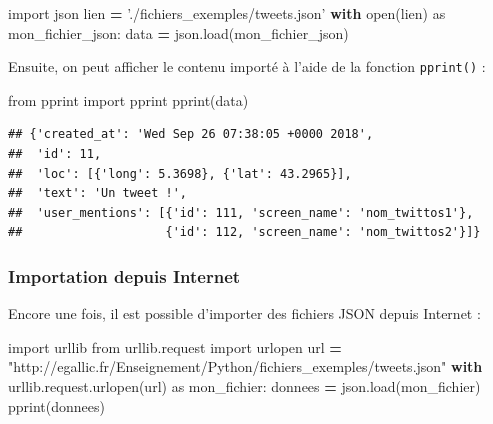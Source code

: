 \documentclass[12pt,]{book}
\newenvironment{Shaded}{\begin{snugshade}}{\end{snugshade}}
\newcommand{\StringTok}[1]{\textcolor[rgb]{0.31,0.60,0.02}{#1}}
\newcommand{\ImportTok}[1]{#1}
\newcommand{\ControlFlowTok}[1]{\textcolor[rgb]{0.13,0.29,0.53}{\textbf{#1}}}
\newcommand{\OperatorTok}[1]{\textcolor[rgb]{0.81,0.36,0.00}{\textbf{#1}}}
\newcommand{\BuiltInTok}[1]{#1}
\newcommand{\NormalTok}[1]{#1}
\numberwithin{equation}{section}
\numberwithin{countremarque}{section}
\begin{document}
\begin{Shaded}
\begin{Highlighting}[]
\ImportTok{import}\NormalTok{ json}
\NormalTok{lien }\OperatorTok{=} \StringTok{'./fichiers_exemples/tweets.json'}
\ControlFlowTok{with} \BuiltInTok{open}\NormalTok{(lien) }\ImportTok{as}\NormalTok{ mon_fichier_json:}
\NormalTok{    data }\OperatorTok{=}\NormalTok{ json.load(mon_fichier_json)}
\end{Highlighting}
\end{Shaded}

Ensuite, on peut afficher le contenu importé à l'aide de la fonction
\texttt{pprint()} :

\begin{Shaded}
\begin{Highlighting}[]
\ImportTok{from}\NormalTok{ pprint }\ImportTok{import}\NormalTok{ pprint}
\NormalTok{pprint(data)}
\end{Highlighting}
\end{Shaded}

\begin{lstlisting}
## {'created_at': 'Wed Sep 26 07:38:05 +0000 2018',
##  'id': 11,
##  'loc': [{'long': 5.3698}, {'lat': 43.2965}],
##  'text': 'Un tweet !',
##  'user_mentions': [{'id': 111, 'screen_name': 'nom_twittos1'},
##                    {'id': 112, 'screen_name': 'nom_twittos2'}]}
\end{lstlisting}

\subsubsection{Importation depuis
Internet}\label{importation-depuis-internet-2}

Encore une fois, il est possible d'importer des fichiers JSON depuis
Internet :

\begin{Shaded}
\begin{Highlighting}[]
\ImportTok{import}\NormalTok{ urllib}
\ImportTok{from}\NormalTok{ urllib.request }\ImportTok{import}\NormalTok{ urlopen}
\NormalTok{url }\OperatorTok{=} \StringTok{"http://egallic.fr/Enseignement/Python/fichiers_exemples/tweets.json"}
\ControlFlowTok{with}\NormalTok{ urllib.request.urlopen(url) }\ImportTok{as}\NormalTok{ mon_fichier:}
\NormalTok{   donnees }\OperatorTok{=}\NormalTok{ json.load(mon_fichier)}
\NormalTok{pprint(donnees)}
\end{Highlighting}
\end{Shaded}
\end{document}
